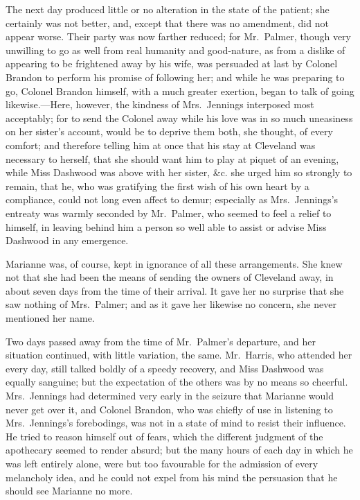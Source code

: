 \documentclass{article}
\begin{document}
The next day produced little or no alteration in the
state of the patient; she certainly was not better, and,
except that there was no amendment, did not appear worse.
Their party was now farther reduced; for Mr.\ Palmer,
though very unwilling to go as well from real humanity
and good-nature, as from a dislike of appearing to be
frightened away by his wife, was persuaded at last
by Colonel Brandon to perform his promise of following her;
and while he was preparing to go, Colonel Brandon himself,
with a much greater exertion, began to talk of going
likewise.---Here, however, the kindness of Mrs.\ Jennings
interposed most acceptably; for to send the Colonel away
while his love was in so much uneasiness on her sister's
account, would be to deprive them both, she thought,
of every comfort; and therefore telling him at once
that his stay at Cleveland was necessary to herself,
that she should want him to play at piquet of an evening,
while Miss Dashwood was above with her sister, \&c. she
urged him so strongly to remain, that he, who was gratifying
the first wish of his own heart by a compliance, could not
long even affect to demur; especially as Mrs.\ Jennings's
entreaty was warmly seconded by Mr.\ Palmer, who seemed
to feel a relief to himself, in leaving behind him a person
so well able to assist or advise Miss Dashwood in any emergence.

Marianne was, of course, kept in ignorance of all
these arrangements.  She knew not that she had been
the means of sending the owners of Cleveland away,
in about seven days from the time of their arrival.
It gave her no surprise that she saw nothing
of Mrs.\ Palmer; and as it gave her likewise no concern,
she never mentioned her name.

Two days passed away from the time of Mr.\ Palmer's departure,
and her situation continued, with little variation,
the same.  Mr.\ Harris, who attended her every day,
still talked boldly of a speedy recovery, and Miss Dashwood
was equally sanguine; but the expectation of the others
was by no means so cheerful.  Mrs.\ Jennings had determined
very early in the seizure that Marianne would never
get over it, and Colonel Brandon, who was chiefly
of use in listening to Mrs.\ Jennings's forebodings,
was not in a state of mind to resist their influence.
He tried to reason himself out of fears, which the different
judgment of the apothecary seemed to render absurd;
but the many hours of each day in which he was left
entirely alone, were but too favourable for the admission
of every melancholy idea, and he could not expel from
his mind the persuasion that he should see Marianne no more.
\end{document}
